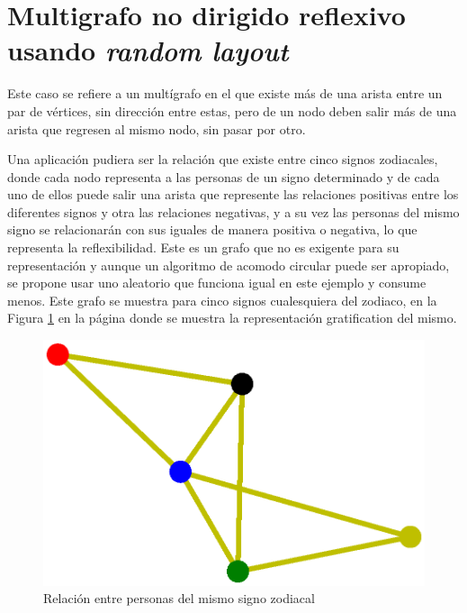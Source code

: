 \documentclass{article}
\begin{document}
\section{Multigrafo no dirigido reflexivo usando \textit{random layout}}

Este caso se refiere a un multígrafo en el que existe más de una arista entre un par de vértices, sin dirección entre estas, pero de un nodo deben salir más de una arista que regresen al mismo nodo, sin pasar por otro.

Una aplicación pudiera ser la relación que existe entre cinco signos zodiacales, donde cada nodo representa a las personas de un signo determinado y de cada uno de ellos puede salir una arista que represente las relaciones positivas entre los diferentes signos y otra las relaciones negativas, y a su vez las personas del mismo signo se relacionarán con sus iguales de manera positiva o negativa, lo que representa la reflexibilidad. Este es un grafo que no es exigente para su representación y aunque un algoritmo de acomodo circular puede ser apropiado, se propone usar uno aleatorio que funciona igual en este ejemplo y consume menos. Este grafo se muestra para cinco signos cualesquiera del zodiaco, en la Figura \ref{fig:Fig09} en la página \pageref{fig:Fig09} donde se muestra la representación gratification del mismo.

\newpage


\begin{figure}[h]
    \centering
    \includegraphics[scale=0.6]{imagenes1/Fig09.eps}
    \caption{Relación entre personas del mismo signo zodiacal}
    \label{fig:Fig09}
\end{figure}
\end{document}
